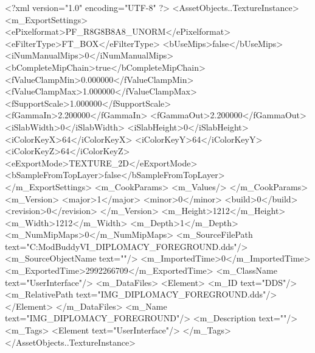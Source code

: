 <?xml version="1.0" encoding="UTF-8" ?>
<AssetObjects..TextureInstance>
	<m_ExportSettings>
		<ePixelformat>PF_R8G8B8A8_UNORM</ePixelformat>
		<eFilterType>FT_BOX</eFilterType>
		<bUseMips>false</bUseMips>
		<iNumManualMips>0</iNumManualMips>
		<bCompleteMipChain>true</bCompleteMipChain>
		<fValueClampMin>0.000000</fValueClampMin>
		<fValueClampMax>1.000000</fValueClampMax>
		<fSupportScale>1.000000</fSupportScale>
		<fGammaIn>2.200000</fGammaIn>
		<fGammaOut>2.200000</fGammaOut>
		<iSlabWidth>0</iSlabWidth>
		<iSlabHeight>0</iSlabHeight>
		<iColorKeyX>64</iColorKeyX>
		<iColorKeyY>64</iColorKeyY>
		<iColorKeyZ>64</iColorKeyZ>
		<eExportMode>TEXTURE_2D</eExportMode>
		<bSampleFromTopLayer>false</bSampleFromTopLayer>
	</m_ExportSettings>
	<m_CookParams>
		<m_Values/>
	</m_CookParams>
	<m_Version>
		<major>1</major>
		<minor>0</minor>
		<build>0</build>
		<revision>0</revision>
	</m_Version>
	<m_Height>1212</m_Height>
	<m_Width>1212</m_Width>
	<m_Depth>1</m_Depth>
	<m_NumMipMaps>0</m_NumMipMaps>
	<m_SourceFilePath text="C:\Users\asus\Documents\Firaxis ModBuddy\Civilization VI\temppic\IMG_DIPLOMACY_FOREGROUND.dds"/>
	<m_SourceObjectName text=""/>
	<m_ImportedTime>0</m_ImportedTime>
	<m_ExportedTime>2992266709</m_ExportedTime>
	<m_ClassName text="UserInterface"/>
	<m_DataFiles>
		<Element>
			<m_ID text="DDS"/>
			<m_RelativePath text="IMG_DIPLOMACY_FOREGROUND.dds"/>
		</Element>
	</m_DataFiles>
	<m_Name text="IMG_DIPLOMACY_FOREGROUND"/>
	<m_Description text=""/>
	<m_Tags>
		<Element text="UserInterface"/>
	</m_Tags>
</AssetObjects..TextureInstance>

